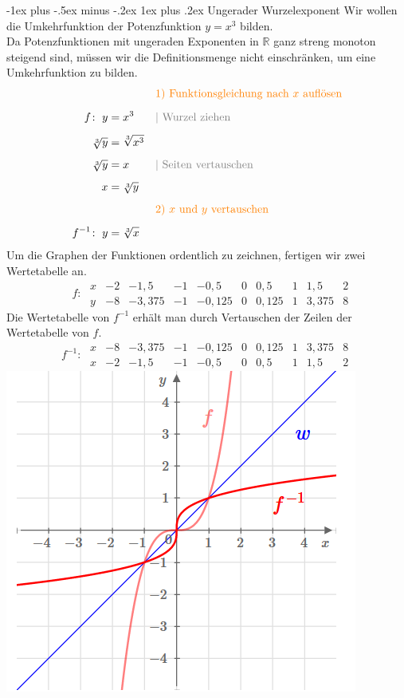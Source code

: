 \documentclass[a4paper,10pt]{article}
\makeatletter
\renewcommand{\subsubsection}{\@startsection{subsubsection}{3}{0mm}%
                                {-1ex plus -.5ex minus -.2ex}%
                                {1ex plus .2ex}%
                                {\normalfont\small\bfseries}}
\makeatother
\begin{document}
\begin{multicols}{3}
    \subsubsection{Ungerader Wurzelexponent}
    Wir wollen die Umkehrfunktion der Potenzfunktion $y = x^3$ bilden. \\
    Da Potenzfunktionen mit ungeraden Exponenten in $\mathbb{R}$ ganz streng monoton steigend sind, müssen wir die Definitionsmenge nicht einschränken, um eine Umkehrfunktion zu bilden.
    \begin{align*} & &&{\color{orange}\text{1) Funktionsgleichung nach $x$ auflösen}} \\[5px] f\colon\; y &= x^3 &&{\color{gray}| \text{ Wurzel ziehen}} \\[5px] \sqrt[3]{y} &= \sqrt[3]{x^3} \\[5px] \sqrt[3]{y} &= x &&{\color{gray}| \text{ Seiten vertauschen}} \\[5px] x &= \sqrt[3]{y} \\[5px] & &&{\color{orange}\text{2) $x$ und $y$ vertauschen}} \\[5px] f^{-1}\colon\; y &= \sqrt[3]{x} \end{align*}
    Um die Graphen der Funktionen ordentlich zu zeichnen, fertigen wir zwei Wertetabelle an.
    \[\phantom{^{-1}}f\colon\; \begin{array}{r|c|c|c|c|c|c|c|c|c} x & -2 & -1{,}5 & -1 & -0{,}5 & 0 & 0{,}5 & 1 & 1{,}5 & 2 \\ \hline y & -8 & -3{,}375 & -1 & -0{,}125 & 0 & 0{,}125 & 1 & 3{,}375 & 8 \end{array}\]
    Die Wertetabelle von $f^{-1}$ erhält man durch Vertauschen der Zeilen der Wertetabelle von $f$.
    \[f^{-1}\colon\; \begin{array}{r|c|c|c|c|c|c|c|c|c} x & -8 & -3{,}375 & -1 & -0{,}125 & 0 & 0{,}125 & 1 & 3{,}375 & 8 \\ \hline x & -2 & -1{,}5 & -1 & -0{,}5 & 0 & 0{,}5 & 1 & 1{,}5 & 2 \end{array}\]
    \includegraphics{wurzelfunktion3}\\~\\

\end{multicols}
\end{document}
